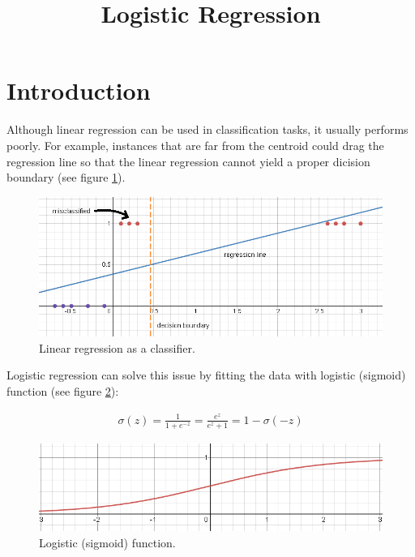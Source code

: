 \documentclass[12pt,a4paper]{article}
\title{Logistic Regression}
\author{}
\date{}
\begin{document}
\maketitle
\tableofcontents

\section{Introduction}

Although linear regression can be used in classification tasks, it
usually performs poorly. For example, instances that are far from the
centroid could drag the regression line so that the linear regression
cannot yield a proper dicision boundary (see figure \ref{linear_reg}).

\begin{figure}[h]
\centering
\includegraphics[scale=0.7]{imgs/linear_reg.png}
\caption{Linear regression as a classifier.\label{linear_reg}}
\end{figure}

Logistic regression can solve this issue by fitting the data with
logistic (sigmoid) function (see figure \ref{sigmoid}):

\begin{align}\label{sigmoid_func}
\sigma(z)=\frac{1}{1+e^{-z}} = \frac{e^z}{e^{z}+1} = 1-\sigma(-z)
\end{align}

\begin{figure}[h]
\centering
\includegraphics[scale=0.7]{imgs/sigmoid.png}
\caption{Logistic (sigmoid) function.\label{sigmoid}}
\end{figure}
\end{document}
